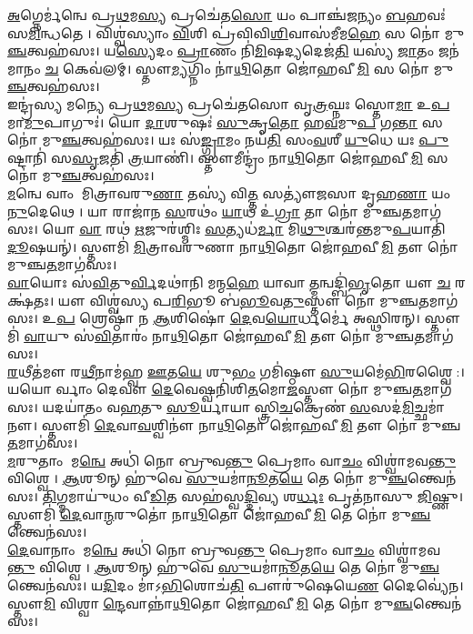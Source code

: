\ul{𑌅}𑌗𑍍𑌨𑍇𑌰𑍍𑌮॑𑌨𑍍𑌵𑍇 𑌪𑍍𑌰\ul{𑌥}𑌮\ul{𑌸𑍍𑌯} 𑌪𑍍𑌰𑌚𑍇॑𑌤\ul{𑌸𑍋} 𑌯𑌂 𑌪𑌾𑌞𑍍𑌚॑𑌜𑌨𑍍𑌯𑌂 \ul{𑌬}𑌹𑌵𑌃॑ 𑌸\ul{𑌮𑌿}𑌨𑍍𑌧𑌤𑍇। 𑌵𑌿𑌶𑍍𑌵॑𑌸𑍍𑌯𑌾𑌂 \ul{𑌵𑌿}𑌶𑌿 𑌪𑍍𑌰॑𑌵𑌿𑌵𑌿\ul{𑌶𑌿}𑌵𑌾𑌸॑𑌮𑍀𑌮\ul{𑌹𑍇} 𑌸 𑌨𑍋॑ 𑌮𑍁\ul{𑌞𑍍𑌚}𑌤𑍍𑌵𑌹॑𑌸𑌃। 𑌯\ul{𑌸𑍍𑌯𑍇}𑌦𑌂 \ul{𑌪𑍍𑌰𑌾}𑌣𑌂 𑌨𑌿॑\ul{𑌮𑌿}𑌷𑌦𑍍𑌯𑌦𑍇𑌜॑\ul{𑌤𑌿} 𑌯𑌸𑍍𑌯॑ \ul{𑌜𑌾}𑌤𑌂 𑌜𑌨॑𑌮𑌾𑌨𑌂 \ul{𑌚} 𑌕𑍇𑌵॑𑌲𑌮𑍍। 𑌸𑍍𑌤𑍗\ul{𑌮𑍍𑌯}𑌗𑍍𑌨𑌿𑌂 𑌨𑌾॑\ul{𑌥𑌿}𑌤𑍋 𑌜𑍋॑𑌹𑌵𑍀\ul{𑌮𑌿} 𑌸 𑌨𑍋॑ 𑌮𑍁\ul{𑌞𑍍𑌚}𑌤𑍍𑌵𑌹॑𑌸𑌃।\\
𑌇𑌨𑍍𑌦𑍍𑌰॑𑌸𑍍𑌯 𑌮𑌨𑍍𑌯𑍇 𑌪𑍍𑌰\ul{𑌥}𑌮\ul{𑌸𑍍𑌯} 𑌪𑍍𑌰𑌚𑍇॑𑌤𑌸𑍋 𑌵𑍃\ul{𑌤𑍍𑌰}𑌘𑍍𑌨𑌃 𑌸𑍍𑌤𑍋\ul{𑌮𑌾} 𑌉\ul{𑌪} 𑌮𑌾\ul{𑌮𑍁}𑌪𑌾𑌗𑍁𑌃॑। 𑌯𑍋 \ul{𑌦𑌾}𑌶𑍁𑌷𑌃॑ \ul{𑌸𑍁}𑌕𑍃\ul{𑌤𑍋} 𑌹\ul{𑌵}𑌮𑍁\ul{𑌪} 𑌗\ul{𑌨𑍍𑌤𑌾} 𑌸 𑌨𑍋॑ 𑌮𑍁\ul{𑌞𑍍𑌚}𑌤𑍍𑌵𑌹॑𑌸𑌃। 𑌯𑌃 𑌸॑\ul{𑌙𑍍𑌗𑍍𑌰𑌾}𑌮𑌂 𑌨𑌯॑\ul{𑌤𑌿} 𑌸𑌂\ul{𑌵}𑌶𑍀 \ul{𑌯𑍁}𑌧𑍇 𑌯𑌃 \ul{𑌪𑍁}𑌷𑍍𑌟𑌾𑌨𑌿॑ 𑌸\ul{𑌸𑍃}𑌜𑌤𑌿॑ \ul{𑌤𑍍𑌰}𑌯𑌾𑌣𑌿॑। 𑌸𑍍𑌤𑍗𑌮𑍀𑌨𑍍𑌦𑍍𑌰𑌂॑ 𑌨𑌾\ul{𑌥𑌿}𑌤𑍋 𑌜𑍋॑𑌹𑌵𑍀\ul{𑌮𑌿} 𑌸 𑌨𑍋॑ 𑌮𑍁\ul{𑌞𑍍𑌚}𑌤𑍍𑌵𑌹॑𑌸𑌃।\\
\ul{𑌮}𑌨𑍍𑌵𑍇 𑌵𑌾𑌂 𑌮𑌿𑌤𑍍𑌰𑌾𑌵𑌰𑍁\ul{𑌣𑌾} 𑌤𑌸𑍍𑌯॑ 𑌵𑌿\ul{𑌤𑍍𑌤}\ul{} 𑌸𑌤𑍍𑌯𑍗॑𑌜𑌸𑌾 𑌦𑍃𑌹\ul{𑌣𑌾} 𑌯𑌂 \ul{𑌨𑍁}𑌦𑍇𑌥𑍇। 𑌯𑌾 𑌰𑌾𑌜𑌾॑𑌨 \ul{𑌸}𑌰𑌥𑌂॑ \ul{𑌯𑌾}𑌥 𑌉॑\ul{𑌗𑍍𑌰𑌾} 𑌤𑌾 𑌨𑍋॑ 𑌮𑍁𑌞𑍍𑌚\ul{𑌤}𑌮𑌾𑌗॑𑌸𑌃। 𑌯𑍋 \ul{𑌵𑌾}\ul{} 𑌰𑌥॑ \ul{𑌋}𑌜𑍁𑌰॑𑌶𑍍𑌮𑌿𑌃 \ul{𑌸}𑌤𑍍𑌯𑌧॑\ul{𑌰𑍍𑌮𑌾} 𑌮𑌿\ul{𑌥𑍁}𑌶𑍍𑌚𑌰॑𑌨𑍍𑌤𑌮𑍁\ul{𑌪}𑌯𑌾𑌤𑌿॑ \ul{𑌦𑍂}𑌷𑌯𑌨𑍍॑। 𑌸𑍍𑌤𑍗𑌮𑌿॑ \ul{𑌮𑌿}𑌤𑍍𑌰𑌾𑌵𑌰𑍁॑𑌣𑌾 𑌨𑌾\ul{𑌥𑌿}𑌤𑍋 𑌜𑍋॑𑌹𑌵𑍀\ul{𑌮𑌿} 𑌤𑍗 𑌨𑍋॑ 𑌮𑍁𑌞𑍍𑌚\ul{𑌤}𑌮𑌾𑌗॑𑌸𑌃।\\
\ul{𑌵𑌾}𑌯𑍋𑌃 𑌸॑\ul{𑌵𑌿}𑌤𑍁\ul{𑌰𑍍𑌵𑌿}𑌦𑌥𑌾॑𑌨𑌿 𑌮𑌨𑍍𑌮\ul{𑌹𑍇} 𑌯𑌾𑌵𑌾\ul{𑌤𑍍𑌮}𑌨𑍍𑌵𑌦𑍍𑌬𑌿॑\ul{𑌭𑍃}𑌤𑍋 𑌯𑍗 \ul{𑌚} 𑌰𑌕𑍍𑌷॑𑌤𑌃। 𑌯𑍗 𑌵𑌿𑌶𑍍𑌵॑𑌸𑍍𑌯 𑌪\ul{𑌰𑌿}𑌭𑍂 𑌬॑\ul{𑌭𑍂}𑌵\ul{𑌤𑍁}𑌸𑍍𑌤𑍗 𑌨𑍋॑ 𑌮𑍁𑌞𑍍𑌚\ul{𑌤}𑌮𑌾𑌗॑𑌸𑌃। 𑌉\ul{𑌪} 𑌶𑍍𑌰𑍇𑌷𑍍𑌠𑌾॑ 𑌨 \ul{𑌆}𑌶𑌿𑌷𑍋॑ \ul{𑌦𑍇}𑌵\ul{𑌯𑍋}𑌰𑍍𑌧𑌰𑍍𑌮𑍇॑ 𑌅𑌸𑍍𑌥𑌿𑌰𑌨𑍍। 𑌸𑍍𑌤𑍗𑌮𑌿॑ \ul{𑌵𑌾}𑌯𑍁 𑌸॑\ul{𑌵𑌿}𑌤𑌾𑌰𑌂॑ 𑌨𑌾\ul{𑌥𑌿}𑌤𑍋 𑌜𑍋॑𑌹𑌵𑍀\ul{𑌮𑌿} 𑌤𑍗 𑌨𑍋॑ 𑌮𑍁𑌞𑍍𑌚\ul{𑌤}𑌮𑌾𑌗॑𑌸𑌃।\\
\ul{𑌰}𑌥𑍀𑌤॑𑌮𑍗 𑌰\ul{𑌥𑍀}𑌨𑌾𑌮॑𑌹𑍍𑌵 \ul{𑌊}𑌤\ul{𑌯𑍇} 𑌶𑍁\ul{𑌭𑌂} 𑌗𑌮𑌿॑𑌷𑍍𑌠𑍗 \ul{𑌸𑍁}𑌯𑌮𑍇॑\ul{𑌭𑌿}𑌰𑌶𑍍𑌵𑍈:। 𑌯𑌯𑍋𑌰𑍍𑌵𑌾𑌂 𑌦𑍇𑌵𑍗 \ul{𑌦𑍇}𑌵𑍇𑌷𑍍𑌵𑌨𑌿॑𑌶𑌿\ul{𑌤}𑌮𑍋\ul{𑌜}𑌸𑍍𑌤𑍗 𑌨𑍋॑ 𑌮𑍁𑌞𑍍𑌚\ul{𑌤}𑌮𑌾𑌗॑𑌸𑌃। 𑌯𑌦𑌯𑌾॑𑌤𑌂 𑌵\ul{𑌹}𑌤𑍁 \ul{𑌸𑍂}𑌰𑍍𑌯𑌾𑌯𑌾𑌸𑍍𑌤𑍍𑌰𑌿\ul{𑌚}𑌕𑍍𑌰𑍇𑌣॑ \ul{𑌸}\ul{}𑌸𑌦॑\ul{𑌮𑌿}𑌚𑍍𑌛𑌮𑌾॑𑌨𑍗। 𑌸𑍍𑌤𑍗𑌮𑌿॑ \ul{𑌦𑍇}𑌵𑌾\ul{𑌵}𑌶𑍍𑌵𑌿𑌨𑍗॑ 𑌨𑌾\ul{𑌥𑌿}𑌤𑍋 𑌜𑍋॑𑌹𑌵𑍀\ul{𑌮𑌿} 𑌤𑍗 𑌨𑍋॑ 𑌮𑍁𑌞𑍍𑌚\ul{𑌤}𑌮𑌾𑌗॑𑌸𑌃।\\
\ul{𑌮}𑌰𑍁𑌤𑌾𑌂 𑌮\ul{𑌨𑍍𑌵𑍇} 𑌅𑌧𑌿॑ 𑌨𑍋 𑌬𑍍𑌰𑍁𑌵\ul{𑌨𑍍𑌤𑍁} 𑌪𑍍𑌰𑍇𑌮𑌾𑌂 𑌵𑌾\ul{𑌚𑌂} 𑌵𑌿𑌶𑍍𑌵𑌾॑𑌮𑌵\ul{𑌨𑍍𑌤𑍁} 𑌵𑌿𑌶𑍍𑌵𑍇। \ul{𑌆}𑌶𑍂𑌨𑍍 𑌹𑍁॑𑌵𑍇 \ul{𑌸𑍁}𑌯𑌮𑌾॑\ul{𑌨𑍂}𑌤\ul{𑌯𑍇} 𑌤𑍇 𑌨𑍋॑ 𑌮𑍁\ul{𑌞𑍍𑌚}𑌨𑍍𑌤𑍍𑌵𑍇𑌨॑𑌸𑌃। \ul{𑌤𑌿}𑌗𑍍𑌮𑌮𑌾𑌯𑍁॑𑌧𑌂 𑌵𑍀\ul{𑌡𑌿}𑌤 𑌸𑌹॑𑌸𑍍𑌵\ul{𑌦𑍍𑌦𑌿}𑌵𑍍𑌯 𑌶\ul{𑌰𑍍𑌧𑌃} 𑌪𑍃𑌤॑𑌨𑌾𑌸𑍁 \ul{𑌜𑌿}𑌷𑍍𑌣𑍁। 𑌸𑍍𑌤𑍗𑌮𑌿॑ \ul{𑌦𑍇}𑌵𑌾\ul{𑌨𑍍𑌮}𑌰𑍁𑌤𑍋॑ 𑌨𑌾\ul{𑌥𑌿}𑌤𑍋 𑌜𑍋॑𑌹𑌵𑍀\ul{𑌮𑌿} 𑌤𑍇 𑌨𑍋॑ 𑌮𑍁\ul{𑌞𑍍𑌚}𑌨𑍍𑌤𑍍𑌵𑍇𑌨॑𑌸𑌃।\\
\ul{𑌦𑍇}𑌵𑌾𑌨𑌾𑌂 𑌮\ul{𑌨𑍍𑌵𑍇} 𑌅𑌧𑌿॑ 𑌨𑍋 𑌬𑍍𑌰𑍁𑌵\ul{𑌨𑍍𑌤𑍁} 𑌪𑍍𑌰𑍇𑌮𑌾𑌂 𑌵𑌾\ul{𑌚𑌂} 𑌵𑌿𑌶𑍍𑌵𑌾॑𑌮𑌵\ul{𑌨𑍍𑌤𑍁} 𑌵𑌿𑌶𑍍𑌵𑍇। \ul{𑌆}𑌶𑍂𑌨𑍍 𑌹𑍁॑𑌵𑍇 \ul{𑌸𑍁}𑌯𑌮𑌾॑\ul{𑌨𑍂}𑌤\ul{𑌯𑍇} 𑌤𑍇 𑌨𑍋॑ 𑌮𑍁\ul{𑌞𑍍𑌚}𑌨𑍍𑌤𑍍𑌵𑍇𑌨॑𑌸𑌃। 𑌯\ul{𑌦𑌿}𑌦𑌂 𑌮𑌾॑𑌽\ul{𑌭𑌿}𑌶𑍋𑌚॑\ul{𑌤𑌿} 𑌪𑍗𑌰𑍁॑𑌷𑍇𑌯𑍇\ul{𑌣} 𑌦𑍈𑌵𑍍𑌯𑍇॑𑌨। 𑌸𑍍𑌤𑍗\ul{𑌮𑌿} 𑌵𑌿𑌶𑍍𑌵𑌾\ul{𑌨𑍍𑌦𑍇}𑌵𑌾𑌨𑍍𑌨𑌾॑\ul{𑌥𑌿}𑌤𑍋 𑌜𑍋॑𑌹𑌵𑍀\ul{𑌮𑌿} 𑌤𑍇 𑌨𑍋॑ 𑌮𑍁\ul{𑌞𑍍𑌚}𑌨𑍍𑌤𑍍𑌵𑍇𑌨॑𑌸𑌃।\\
